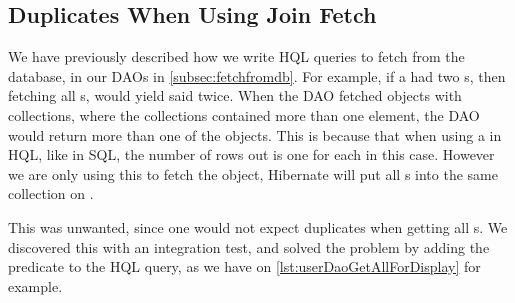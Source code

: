 \subsection{Duplicates When Using Join Fetch}
We have previously described how we write \ac{HQL} queries to fetch from the database, in our \acp{DAO} in \cref{subsec:fetchfromdb}.
For example, if a  had two s, then fetching all s, would yield said  twice.
When the \ac{DAO} fetched objects with collections, where the collections contained more than one element, the \ac{DAO} would return more than one of the objects.
This is because that when using a  in \ac{HQL}, like in \ac{SQL}, the number of rows out is one for each  in this case.
However we are only using this to fetch the object, Hibernate will put all s into the same collection on .

This was unwanted, since one would not expect duplicates when getting all s.
We discovered this with an integration test, and solved the problem by adding the predicate  to the \ac{HQL} query, as we have on \cref{lst:userDaoGetAllForDisplay} for example.



